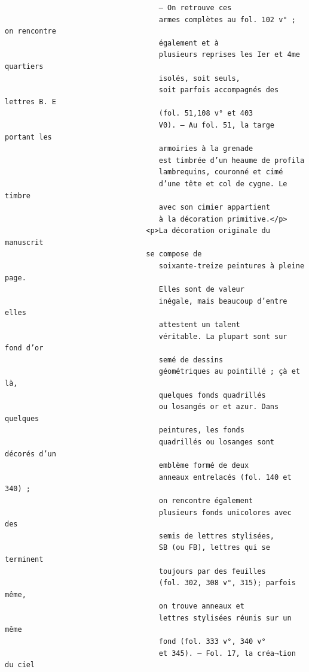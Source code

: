 \documentclass[a4paper,12pt,twoside]{book}
\begin{document}
\begin{verbatim}
                                    — On retrouve ces
                                    armes complètes au fol. 102 v° ; on rencontre
                                    également et à
                                    plusieurs reprises les Ier et 4me quartiers 
                                    isolés, soit seuls,
                                    soit parfois accompagnés des lettres B. E 
                                    (fol. 51,108 v° et 403
                                    V0). — Au fol. 51, la targe portant les 
                                    armoiries à la grenade
                                    est timbrée d’un heaume de profila 
                                    lambrequins, couronné et cimé
                                    d’une tête et col de cygne. Le timbre 
                                    avec son cimier appartient
                                    à la décoration primitive.</p>
                                 <p>La décoration originale du manuscrit
                                 se compose de
                                    soixante-treize peintures à pleine page.
                                    Elles sont de valeur
                                    inégale, mais beaucoup d’entre elles
                                    attestent un talent
                                    véritable. La plupart sont sur fond d’or
                                    semé de dessins
                                    géométriques au pointillé ; çà et là, 
                                    quelques fonds quadrillés
                                    ou losangés or et azur. Dans quelques 
                                    peintures, les fonds
                                    quadrillés ou losanges sont décorés d’un 
                                    emblème formé de deux
                                    anneaux entrelacés (fol. 140 et 340) ;
                                    on rencontre également
                                    plusieurs fonds unicolores avec des 
                                    semis de lettres stylisées,
                                    SB (ou FB), lettres qui se terminent 
                                    toujours par des feuilles
                                    (fol. 302, 308 v°, 315); parfois même,
                                    on trouve anneaux et
                                    lettres stylisées réunis sur un même 
                                    fond (fol. 333 v°, 340 v°
                                    et 345). — Fol. 17, la créa¬tion du ciel

\end{verbatim}
\end{document}
